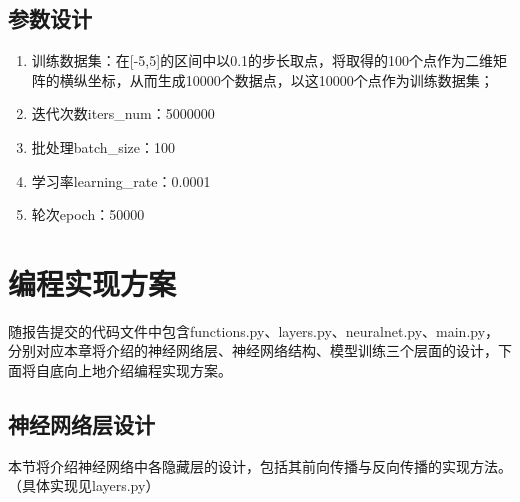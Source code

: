 \documentclass{article}
\begin{document}
\subsection{参数设计}
\begin{enumerate}[1)]
	\item 训练数据集：在[-5,5]的区间中以0.1的步长取点，将取得的100个点作为二维矩阵的横纵坐标，从而生成10000个数据点，以这10000个点作为训练数据集；
	\item 迭代次数iters\_num：5000000
	\item 批处理batch\_size：100
	\item 学习率learning\_rate：0.0001
	\item 轮次epoch：50000
\end{enumerate}


\section{编程实现方案}
随报告提交的代码文件中包含functions.py、layers.py、neuralnet.py、main.py，分别对应本章将介绍的神经网络层、神经网络结构、模型训练三个层面的设计，下面将自底向上地介绍编程实现方案。
\subsection{神经网络层设计}
本节将介绍神经网络中各隐藏层的设计，包括其前向传播与反向传播的实现方法。（具体实现见layers.py）
\end{document}
